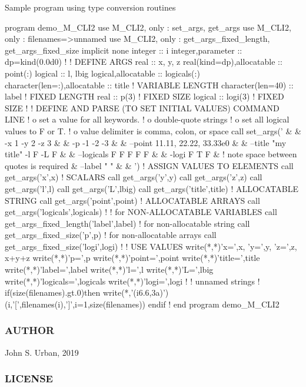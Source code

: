 Sample program using type conversion routines \begin{DoxyVerb}program demo_M_CLI2
use M_CLI2,  only : set_args, get_args
use M_CLI2,  only : filenames=>unnamed
use M_CLI2,  only : get_args_fixed_length, get_args_fixed_size
implicit none
integer                      :: i
integer,parameter            :: dp=kind(0.0d0)
!
! DEFINE ARGS
real                         :: x, y, z
real(kind=dp),allocatable    :: point(:)
logical                      :: l, lbig
logical,allocatable          :: logicals(:)
character(len=:),allocatable :: title    ! VARIABLE LENGTH
character(len=40)            :: label    ! FIXED LENGTH
real                         :: p(3)     ! FIXED SIZE
logical                      :: logi(3)  ! FIXED SIZE
!
! DEFINE AND PARSE (TO SET INITIAL VALUES) COMMAND LINE
!   o set a value for all keywords.
!   o double-quote strings
!   o set all logical values to F or T.
!   o value delimiter is comma, colon, or space
call set_args('                         &
        & -x 1 -y 2 -z 3                &
        & -p -1 -2 -3                   &
        & --point 11.11, 22.22, 33.33e0 &
        & --title "my title" -l F -L F  &
        & --logicals  F F F F F         &
        & -logi F T F                   &
        ! note space between quotes is required
        & --label " " &
        & ')
! ASSIGN VALUES TO ELEMENTS
call get_args('x',x)         ! SCALARS
call get_args('y',y)
call get_args('z',z)
call get_args('l',l)
call get_args('L',lbig)
call get_args('title',title) ! ALLOCATABLE STRING
call get_args('point',point) ! ALLOCATABLE ARRAYS
call get_args('logicals',logicals)
!
! for NON-ALLOCATABLE VARIABLES
call get_args_fixed_length('label',label) ! for non-allocatable string
call get_args_fixed_size('p',p)           ! for non-allocatable arrays
call get_args_fixed_size('logi',logi)
!
! USE VALUES
write(*,*)'x=',x, 'y=',y, 'z=',z, x+y+z
write(*,*)'p=',p
write(*,*)'point=',point
write(*,*)'title=',title
write(*,*)'label=',label
write(*,*)'l=',l
write(*,*)'L=',lbig
write(*,*)'logicals=',logicals
write(*,*)'logi=',logi
!
! unnamed strings
!
if(size(filenames).gt.0)then
   write(*,'(i6.6,3a)')(i,'[',filenames(i),']',i=1,size(filenames))
endif
!
end program demo_M_CLI2
\end{DoxyVerb}


\subsubsection*{A\+U\+T\+H\+OR}

John S. Urban, 2019 \subsubsection*{L\+I\+C\+E\+N\+SE}

